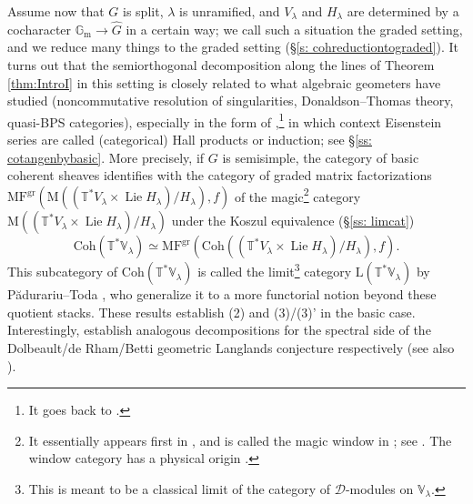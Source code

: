\documentclass{amsart}
\theoremstyle{definition}
\theoremstyle{remark}
\numberwithin{equation}{section}
\DeclareMathOperator{\Lie}{Lie}
\newcommand{\mc}{\mathcal}
\newcommand{\Gm}{{\mathbb{G}_{\mathrm{m}}}}
\newcommand{\wh}{\widehat}
\newcommand{\Coh}{\mathrm{Coh}}
\newcommand{\V}{\mathbb{V}}
\newcommand{\T}{\mathbb{T}}
\DeclareMathOperator{\gr}{gr}
\newcommand{\MF}{\mathrm{MF}}
\newcommand{\mrL}{\mathrm{L}}
\newcommand{\M}{\mathrm{M}}
\begin{document}
Assume now that $G$ is split, $\lambda$ is unramified, and $V_\lambda$ and $H_\lambda$ are determined by a cocharacter $\Gm\to \wh G$ in a certain way; we call such a situation the graded setting, and we reduce many things to the graded setting (\S \ref{s: cohreductiontograded}). It turns out that the semiorthogonal decomposition along the lines of Theorem \ref{thm:IntroI} in this setting is closely related to what algebraic geometers have studied (noncommutative resolution of singularities, Donaldson--Thomas theory, quasi-BPS categories), especially in the form of \cite{BuPadurariuToda},\footnote{It goes back to \cite[Proposition 7.4]{SpenkoVandenBerghSOD}.} in which context Eisenstein series are called (categorical) Hall products or induction; see \S \ref{ss: cotangenbybasic}. More precisely, if $G$ is semisimple, the category of basic coherent sheaves identifies with the category of graded matrix factorizations $\MF^{\gr}(\M((\T^*V_{\lambda}\times \Lie H_\lambda)/H_{\lambda}), f)$ of the magic\footnote{It essentially appears first in \cite{SpenkoVandenBergh}, and is called the magic window in \cite{HalpernLeistnerSam}; see \cite[footnote 14]{PTDolbeault}. The  window category has a physical origin \cite{HerbstHoriPage}.} category $\M((\T^*V_{\lambda}\times \Lie H_\lambda)/H_\lambda)$ under the Koszul equivalence (\S \ref{ss: limcat})
\[
\Coh(\T^*\V_\lambda) \simeq \MF^{\gr}(\Coh((\T^*V_{\lambda}\times \Lie H_\lambda)/H_{\lambda}), f). 
\]
This subcategory of $\Coh(\T^{\ast}\V_{\lambda})$ is called the limit\footnote{This is meant to be a classical limit of the category of $\mc D$-modules on $\V_\lambda$.} category $\mrL(\T^*\V_\lambda)$  by P\u{a}durariu--Toda \cite{PTDolbeault}, who generalize it to a more functorial notion beyond these quotient stacks. These results establish (2) and (3)/(3)' in the basic case. Interestingly, \cite[\S 4.4.3, \S 4.4.4, \S 4.4.5]{BuPadurariuToda} establish analogous decompositions for the spectral side of the Dolbeault/de Rham/Betti geometric Langlands conjecture respectively (see also \cite[Theorem 1.1]{PTHiggs}). 
\end{document}
